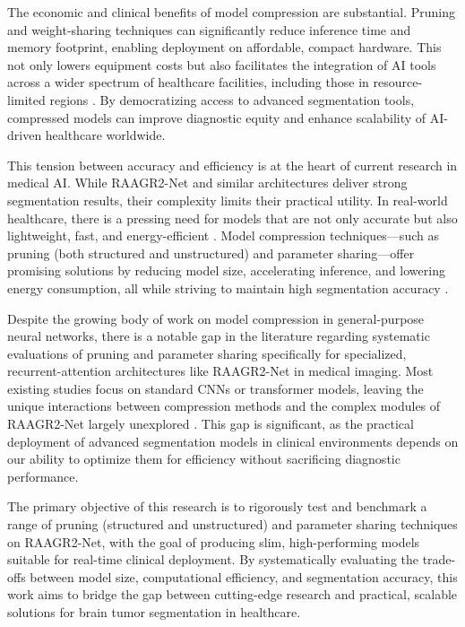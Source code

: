 \documentclass[12pt,a4paper]{article}
\begin{document}
The economic and clinical benefits of model compression are substantial. Pruning and weight-sharing techniques can significantly reduce inference time and memory footprint, enabling deployment on affordable, compact hardware. This not only lowers equipment costs but also facilitates the integration of AI tools across a wider spectrum of healthcare facilities, including those in resource-limited regions \citep{Wu2023, Ragab2024}. By democratizing access to advanced segmentation tools, compressed models can improve diagnostic equity and enhance scalability of AI-driven healthcare worldwide.

This tension between accuracy and efficiency is at the heart of current research in medical AI. While RAAGR2-Net and similar architectures deliver strong segmentation results, their complexity limits their practical utility. In real-world healthcare, there is a pressing need for models that are not only accurate but also lightweight, fast, and energy-efficient \citep{Mazurek2024, Wu2023}. Model compression techniques—such as pruning (both structured and unstructured) and parameter sharing—offer promising solutions by reducing model size, accelerating inference, and lowering energy consumption, all while striving to maintain high segmentation accuracy \citep{Mazurek2024, Wu2023, Jeong2021}.

Despite the growing body of work on model compression in general-purpose neural networks, there is a notable gap in the literature regarding systematic evaluations of pruning and parameter sharing specifically for specialized, recurrent-attention architectures like RAAGR2-Net in medical imaging. Most existing studies focus on standard CNNs or transformer models, leaving the unique interactions between compression methods and the complex modules of RAAGR2-Net largely unexplored \citep{Mazurek2024, Jeong2021}. This gap is significant, as the practical deployment of advanced segmentation models in clinical environments depends on our ability to optimize them for efficiency without sacrificing diagnostic performance.

The primary objective of this research is to rigorously test and benchmark a range of pruning (structured and unstructured) and parameter sharing techniques on RAAGR2-Net, with the goal of producing slim, high-performing models suitable for real-time clinical deployment. By systematically evaluating the trade-offs between model size, computational efficiency, and segmentation accuracy, this work aims to bridge the gap between cutting-edge research and practical, scalable solutions for brain tumor segmentation in healthcare.
\end{document}

